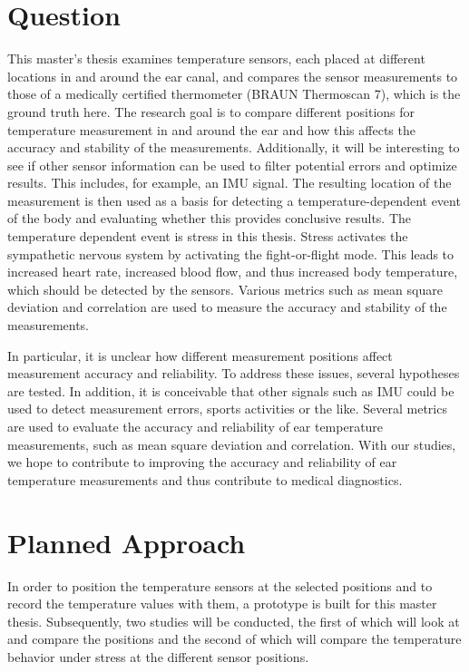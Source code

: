 \section{Question}
\label{ch:Introduction:Question}
This master's thesis examines temperature sensors, each placed at different locations in and around the ear canal, and compares the sensor measurements to those of a medically certified thermometer (BRAUN Thermoscan 7), which is the ground truth here.
The research goal is to compare different positions for temperature measurement in and around the ear and how this affects the accuracy and stability of the measurements.
Additionally, it will be interesting to see if other sensor information can be used to filter potential errors and optimize results. 
This includes, for example, an IMU signal. 
The resulting location of the measurement is then used as a basis for detecting a temperature-dependent event of the body and evaluating whether this provides conclusive results.
The temperature dependent event is stress in this thesis.
Stress activates the sympathetic nervous system by activating the fight-or-flight mode.
This leads to increased heart rate, increased blood flow, and thus increased body temperature, which should be detected by the sensors.
Various metrics such as mean square deviation and correlation are used to measure the accuracy and stability of the measurements.

In particular, it is unclear how different measurement positions affect measurement accuracy and reliability.
To address these issues, several hypotheses are tested. 
In addition, it is conceivable that other signals such as IMU could be used to detect measurement errors, sports activities or the like.
Several metrics are used to evaluate the accuracy and reliability of ear temperature measurements, such as mean square deviation and correlation.
With our studies, we hope to contribute to improving the accuracy and reliability of ear temperature measurements and thus contribute to medical diagnostics.

\section{Planned Approach}
\label{ch:Introduction:PlannedApproach}
In order to position the temperature sensors at the selected positions and to record the temperature values with them, a prototype is built for this master thesis.
Subsequently, two studies will be conducted, the first of which will look at and compare the positions and the second of which will compare the temperature behavior under stress at the different sensor positions.

